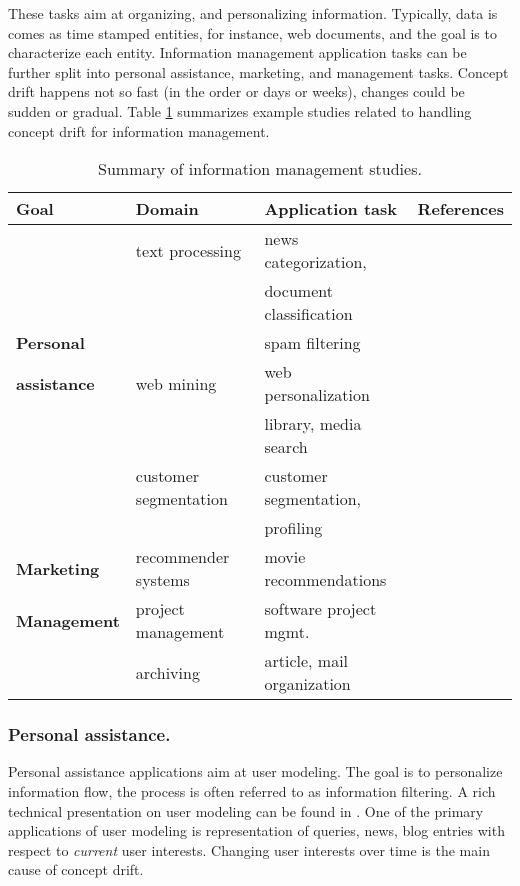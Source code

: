 \documentclass{llncs}
\begin{document}
These tasks aim at organizing, and personalizing information.
Typically, data is comes as time stamped entities, for instance, web documents,
and the goal is to characterize each entity.
Information management application tasks can be further split into personal assistance, marketing, and management tasks.
Concept drift happens not so fast (in the order or days or weeks), changes could be sudden or gradual.
Table \ref{tab:inf_man} summarizes example studies related to handling concept drift  for information management.
\begin{table}[t]
\caption{Summary of information management studies.}
\centering
{\footnotesize
\begin{tabular}{|llll|}
\hline
\textbf{Goal} & \textbf{Domain} & \textbf{Application task} & \textbf{References} \\
\hline
		& text processing & news categorization, & \cite{Widyantoro05,Billsus99,Lebanon08,Mourao08} \\
		& & document classification & \\
\textbf{Personal}& 			& spam filtering & \cite{Delany06,Riverola07} \\
\textbf{assistance}& web mining & web personalization & \cite{Scanlan08,Silva07,deBra03} \\
		& & library, media search & \cite{Hasan08,Flasch07} \\
\hline	
		& customer segmentation & customer segmentation,  &	 \cite{Crespo05,Black02,Lathia08,Rozsypal05} \\
		& 	& profiling & \\
\textbf{Marketing}& recommender systems & movie recommendations & \cite{Koren10,Ding05} \\
\hline
\textbf{Management}& project management & software project mgmt. &  \cite{Ekanayake09} \\
			& archiving & article, mail organization & \cite{Yang06,Kleinberg02} \\	
\hline		
\end{tabular}
}
\label{tab:inf_man}
\end{table}

\subsubsection{Personal assistance.}

Personal assistance applications aim at user modeling.
The goal is to personalize information flow, the process is often referred to as information filtering.
A rich technical presentation on user modeling can be found in \cite{Gauch07}.
One of the primary applications of user modeling is representation of queries, news,
blog entries with respect to \emph{current} user interests.
Changing user interests over time is the main cause of concept drift.
\end{document}
